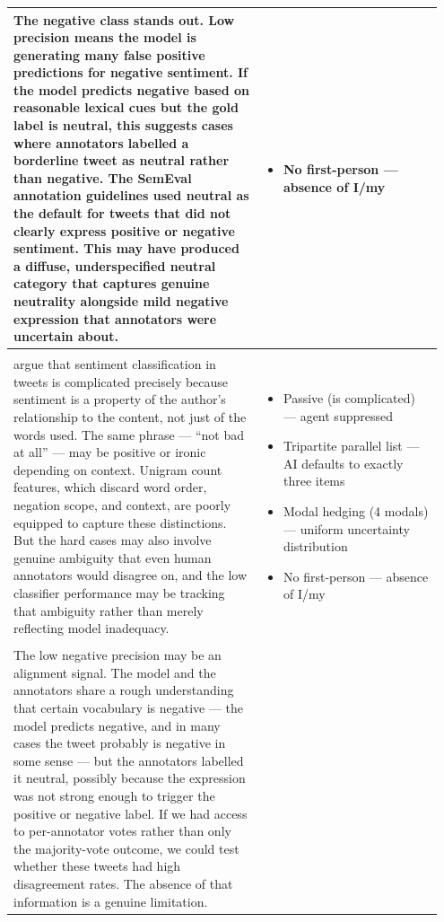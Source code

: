 \documentclass[11pt]{article}
\begin{document}
\begin{longtable}{|p{0.55\linewidth}|p{0.40\linewidth}|}
The negative class stands out. Low precision means the model is generating many false positive predictions for negative sentiment. If the model predicts negative based on reasonable lexical cues but the gold label is neutral, this suggests cases where annotators labelled a borderline tweet as neutral rather than negative. The SemEval annotation guidelines used neutral as the default for tweets that did not clearly express positive or negative sentiment. This may have produced a diffuse, underspecified neutral category that captures genuine neutrality alongside mild negative expression that annotators were uncertain about. & \begin{itemize}[leftmargin=1em,itemsep=1pt,topsep=1pt,parsep=0pt]
  \item No first-person --- absence of I/my
\end{itemize} \\[2pt]
\hline
\rule[-3.5cm]{0pt}{3.5cm} & \\
\hline
argue that sentiment classification in tweets is complicated precisely because sentiment is a property of the author's relationship to the content, not just of the words used. The same phrase --- ``not bad at all'' --- may be positive or ironic depending on context. Unigram count features, which discard word order, negation scope, and context, are poorly equipped to capture these distinctions. But the hard cases may also involve genuine ambiguity that even human annotators would disagree on, and the low classifier performance may be tracking that ambiguity rather than merely reflecting model inadequacy. & \begin{itemize}[leftmargin=1em,itemsep=1pt,topsep=1pt,parsep=0pt]
  \item Passive (is complicated) --- agent suppressed
  \item Tripartite parallel list --- AI defaults to exactly three items
  \item Modal hedging (4 modals) --- uniform uncertainty distribution
  \item No first-person --- absence of I/my
\end{itemize} \\[2pt]
\hline
\rule[-3.5cm]{0pt}{3.5cm} & \\
\hline
The low negative precision may be an alignment signal. The model and the annotators share a rough understanding that certain vocabulary is negative --- the model predicts negative, and in many cases the tweet probably is negative in some sense --- but the annotators labelled it neutral, possibly because the expression was not strong enough to trigger the positive or negative label. If we had access to per-annotator votes rather than only the majority-vote outcome, we could test whether these tweets had high disagreement rates. The absence of that information is a genuine limitation. & \begin{itemize}[leftmargin=1em,itemsep=1pt,topsep=1pt,parsep=0pt]

\end{itemize}
\end{longtable}
\end{document}
